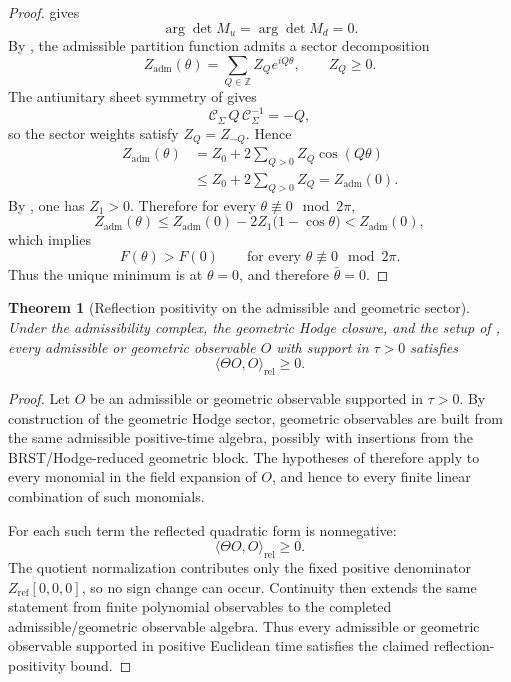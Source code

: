 \documentclass[11pt,a4paper]{article}
\newtheorem{theorem}{Theorem}[section]
\theoremstyle{definition}
\theoremstyle{remark}
\begin{document}
\begin{proof}
 gives
\[
\arg\det M_u=\arg\det M_d=0.
\]
By , the admissible partition function admits a sector
decomposition
\[
Z_{\mathrm{adm}}(\theta)=\sum_{Q\in\mathbb Z} Z_Q e^{iQ\theta},
\qquad
Z_Q\ge 0.
\]
The antiunitary sheet symmetry of  gives
\[
\mathcal C_\Sigma\,Q\,\mathcal C_\Sigma^{-1}=-Q,
\]
so the sector weights satisfy $Z_Q=Z_{-Q}$. Hence
\[
\begin{aligned}
Z_{\mathrm{adm}}(\theta)
&=Z_0+2\sum_{Q>0}Z_Q\cos(Q\theta)\\
&\le Z_0+2\sum_{Q>0}Z_Q
=Z_{\mathrm{adm}}(0).
\end{aligned}
\]
By , one has $Z_1>0$. Therefore for every
$\theta\not\equiv 0\mod 2\pi$,
\[
Z_{\mathrm{adm}}(\theta)
\le
Z_{\mathrm{adm}}(0)-2Z_1\bigl(1-\cos\theta\bigr)
<
Z_{\mathrm{adm}}(0),
\]
which implies
\[
F(\theta)>F(0)
\qquad
\text{for every }\theta\not\equiv 0\mod 2\pi.
\]
Thus the unique minimum is at $\theta=0$, and therefore $\bar\theta=0$.
\end{proof}

\begin{theorem}[Reflection positivity on the admissible and geometric sector]
\label{thm:reflection-positivity-admissible}
Under the admissibility complex, the geometric Hodge closure, and the setup of
, every admissible
or geometric observable $O$ with support in $\tau>0$ satisfies
\[
\langle \Theta O,O\rangle_{\mathrm{rel}}\ge 0.
\]
\end{theorem}

\begin{proof}
Let $O$ be an admissible or geometric observable supported in $\tau>0$. By construction of the
geometric Hodge sector, geometric observables are built from the same admissible positive-time
algebra, possibly with insertions from the BRST/Hodge-reduced geometric block. The hypotheses of
 therefore apply to every monomial in the field expansion
of $O$, and hence to every finite linear combination of such monomials.

For each such term the reflected quadratic form is nonnegative:
\[
\langle \Theta O,O\rangle_{\mathrm{rel}}\ge 0.
\]
The quotient normalization contributes only the fixed positive denominator
$Z_{\mathrm{ref}}[0,0,0]$, so no sign change can occur. Continuity then extends the same statement
from finite polynomial observables to the completed admissible/geometric observable algebra. Thus
every admissible or geometric observable supported in positive Euclidean time satisfies the claimed
reflection-positivity bound.
\end{proof}
\end{document}
